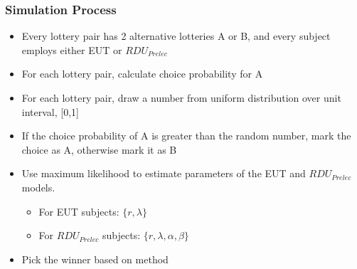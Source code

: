 \documentclass{beamer}
\newcommand\Prob{\ensuremath{\mathit{Pr}}}  %
\begin{document}
\begin{frame}
\frametitle{Simulation Process}
\begin{itemize}
	\item Every lottery pair has 2 alternative lotteries A or B, and every subject employs either EUT or $\mathit{RDU_{Prelec}}$
	\item For each lottery pair, calculate choice probability for A
	\item For each lottery pair, draw a number from uniform distribution over unit interval, [0,1]
	\item If the choice probability of A is greater than the random number, mark the choice as A, otherwise mark it as B
	\item Use maximum likelihood to estimate parameters of the EUT and $\mathit{RDU_{Prelec}}$ models.
		\begin{itemize}
			\item For EUT subjects: $\lbrace r, \lambda \rbrace$
			\item For $\mathit{RDU_{Prelec}}$ subjects: $\lbrace r, \lambda, \alpha, \beta \rbrace$
		\end{itemize}
	\item Pick the winner based on \textcite{Harrison2016} method
\end{itemize}
\end{frame}
%
%
\end{document}
